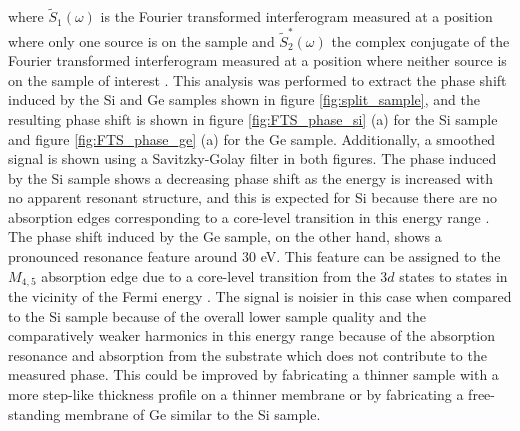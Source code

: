 where $\tilde{S}_{1}(\omega)$ is the Fourier transformed interferogram measured at a position where only one source is on the sample and $\tilde{S}_{2}^{\ast}(\omega)$ the complex conjugate of the Fourier transformed interferogram measured at a position where neither source is on the sample of interest \cite{jansenBroadbandExtremeUltraviolet2019}.  This analysis was performed to extract the phase shift induced by the Si and Ge samples shown in figure \ref{fig:split_sample}, and the resulting phase shift is shown in figure \ref{fig:FTS_phase_si} (a) for the Si sample and figure \ref{fig:FTS_phase_ge} (a) for the Ge sample. Additionally, a smoothed signal is shown using a Savitzky-Golay filter in both figures. The phase induced by the Si sample shows a decreasing phase shift as the energy is increased with no apparent resonant structure, and this is expected for Si because there are no absorption edges corresponding to a core-level transition in this energy range \cite{henkeXRayInteractionsPhotoabsorption1993}.  The phase shift induced by the Ge sample, on the other hand, shows a pronounced resonance feature around 30 eV.  This feature can be assigned to the $M_{4,5}$ absorption edge due to a core-level transition from the $3d$ states to states in the vicinity of the Fermi energy \cite{henkeXRayInteractionsPhotoabsorption1993, kaplanRetrievalComplexvaluedRefractive2019, borjaExtremeUltravioletTransient2016, krausAttosecondTransientReflectivity2016, zurchDirectSimultaneousObservation2017, zurchUltrafastCarrierThermalization2017}. The signal is noisier in this case when compared to the Si sample because of the overall lower sample quality and the comparatively weaker harmonics in this energy range because of the absorption resonance and absorption from the substrate which does not contribute to the measured phase.  This could be improved by fabricating a thinner sample with a more step-like thickness profile on a thinner membrane or by fabricating a free-standing membrane of Ge similar to the Si sample.


